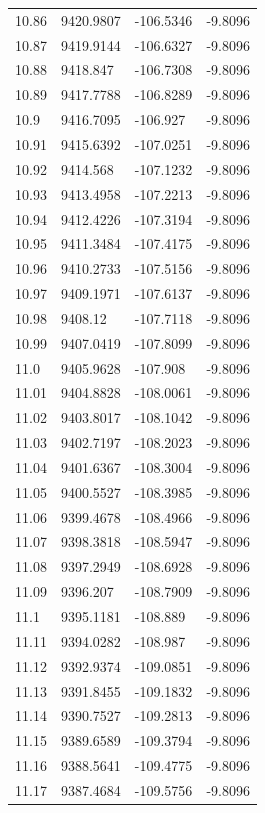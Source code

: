 \begin{table}[H]
\begin{tabular}{llll}
10.86 & 9420.9807 & -106.5346 & -9.8096 \\
10.87 & 9419.9144 & -106.6327 & -9.8096 \\
10.88 & 9418.847 & -106.7308 & -9.8096 \\
10.89 & 9417.7788 & -106.8289 & -9.8096 \\
10.9 & 9416.7095 & -106.927 & -9.8096 \\
10.91 & 9415.6392 & -107.0251 & -9.8096 \\
10.92 & 9414.568 & -107.1232 & -9.8096 \\
10.93 & 9413.4958 & -107.2213 & -9.8096 \\
10.94 & 9412.4226 & -107.3194 & -9.8096 \\
10.95 & 9411.3484 & -107.4175 & -9.8096 \\
10.96 & 9410.2733 & -107.5156 & -9.8096 \\
10.97 & 9409.1971 & -107.6137 & -9.8096 \\
10.98 & 9408.12 & -107.7118 & -9.8096 \\
10.99 & 9407.0419 & -107.8099 & -9.8096 \\
11.0 & 9405.9628 & -107.908 & -9.8096 \\
11.01 & 9404.8828 & -108.0061 & -9.8096 \\
11.02 & 9403.8017 & -108.1042 & -9.8096 \\
11.03 & 9402.7197 & -108.2023 & -9.8096 \\
11.04 & 9401.6367 & -108.3004 & -9.8096 \\
11.05 & 9400.5527 & -108.3985 & -9.8096 \\
11.06 & 9399.4678 & -108.4966 & -9.8096 \\
11.07 & 9398.3818 & -108.5947 & -9.8096 \\
11.08 & 9397.2949 & -108.6928 & -9.8096 \\
11.09 & 9396.207 & -108.7909 & -9.8096 \\
11.1 & 9395.1181 & -108.889 & -9.8096 \\
11.11 & 9394.0282 & -108.987 & -9.8096 \\
11.12 & 9392.9374 & -109.0851 & -9.8096 \\
11.13 & 9391.8455 & -109.1832 & -9.8096 \\
11.14 & 9390.7527 & -109.2813 & -9.8096 \\
11.15 & 9389.6589 & -109.3794 & -9.8096 \\
11.16 & 9388.5641 & -109.4775 & -9.8096 \\
11.17 & 9387.4684 & -109.5756 & -9.8096 \\

\end{tabular}
\end{table}
